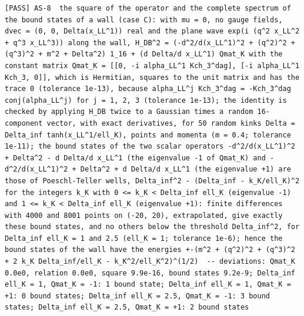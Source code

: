 \documentclass[
  10pt,
]{article}
\begin{document}
\begin{verbatim}
[PASS] AS-8  the square of the operator and the complete spectrum of the bound states of a wall (case C): with mu = 0, no gauge fields, dvec = (0, 0, Delta(x_LL^1)) real and the plane wave exp(i (q^2 x_LL^2 + q^3 x_LL^3)) along the wall, H_DB^2 = (-d^2/d(x_LL^1)^2 + (q^2)^2 + (q^3)^2 + m^2 + Delta^2) 1_16 + (d Delta/d x_LL^1) Qmat_K with the constant matrix Qmat_K = [[0, -i alpha_LL^1 Kch_3^dag], [-i alpha_LL^1 Kch_3, 0]], which is Hermitian, squares to the unit matrix and has the trace 0 (tolerance 1e-13), because alpha_LL^j Kch_3^dag = -Kch_3^dag conj(alpha_LL^j) for j = 1, 2, 3 (tolerance 1e-13); the identity is checked by applying H_DB twice to a Gaussian times a random 16-component vector, with exact derivatives, for 50 random kinks Delta = Delta_inf tanh(x_LL^1/ell_K), points and momenta (m = 0.4; tolerance 1e-11); the bound states of the two scalar operators -d^2/d(x_LL^1)^2 + Delta^2 - d Delta/d x_LL^1 (the eigenvalue -1 of Qmat_K) and -d^2/d(x_LL^1)^2 + Delta^2 + d Delta/d x_LL^1 (the eigenvalue +1) are those of Poeschl-Teller wells, Delta_inf^2 - (Delta_inf - k_K/ell_K)^2 for the integers k_K with 0 <= k_K < Delta_inf ell_K (eigenvalue -1) and 1 <= k_K < Delta_inf ell_K (eigenvalue +1): finite differences with 4000 and 8001 points on (-20, 20), extrapolated, give exactly these bound states, and no others below the threshold Delta_inf^2, for Delta_inf ell_K = 1 and 2.5 (ell_K = 1; tolerance 1e-6); hence the bound states of the wall have the energies +-(m^2 + (q^2)^2 + (q^3)^2 + 2 k_K Delta_inf/ell_K - k_K^2/ell_K^2)^(1/2)  -- deviations: Qmat_K 0.0e0, relation 0.0e0, square 9.9e-16, bound states 9.2e-9; Delta_inf ell_K = 1, Qmat_K = -1: 1 bound state; Delta_inf ell_K = 1, Qmat_K = +1: 0 bound states; Delta_inf ell_K = 2.5, Qmat_K = -1: 3 bound states; Delta_inf ell_K = 2.5, Qmat_K = +1: 2 bound states

\end{verbatim}
\end{document}
